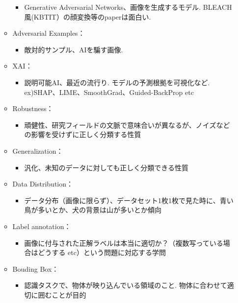 \begin{itemize}
\begin{itemize}
    \begin{itemize}
    \tightlist
    \item
      Generative Adversarial Networks、画像を生成するモデル.
      BLEACH風(KBTIT）の顔変換等のpaperは面白い.
    \end{itemize}
  \item
    Adversarial Examples：

    \begin{itemize}
    \tightlist
    \item
      敵対的サンプル、AIを騙す画像.
    \end{itemize}
  \item
    XAI：

    \begin{itemize}
    \tightlist
    \item
      説明可能AI、最近の流行り. モデルの予測根拠を可視化など.
      ex)SHAP、LIME、SmoothGrad、Guided-BackProp etc
    \end{itemize}
  \item
    Robustness：

    \begin{itemize}
    \tightlist
    \item
      頑健性、研究フィールドの文脈で意味合いが異なるが、ノイズなどの影響を受けずに正しく分類する性質
    \end{itemize}
  \item
    Generalization：

    \begin{itemize}
    \tightlist
    \item
      汎化、未知のデータに対しても正しく分類できる性質
    \end{itemize}
  \item
    Data Distribution：

    \begin{itemize}
    \tightlist
    \item
      データ分布（画像に限らず）、データセット1枚1枚で見た時に、青い鳥が多いとか、犬の背景は山が多いとか傾向
    \end{itemize}
  \item
    Label annotation：

    \begin{itemize}
    \tightlist
    \item
      画像に付与された正解ラベルは本当に適切か？（複数写っている場合はどうする
      etc）という問題に対応する学問
    \end{itemize}
  \item
    Bouding Box：

    \begin{itemize}
    \tightlist
    \item
      認識タスクで、物体が映り込んでいる領域のこと.
      物体に合わせて適切に囲むことが目的
    \end{itemize}
  \end{itemize}
\end{itemize}

